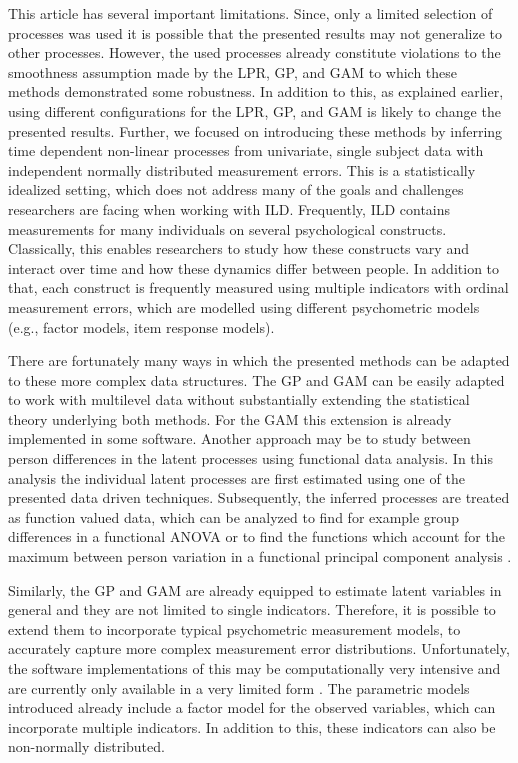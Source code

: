 \documentclass[man, floatsintext]{apa7}
\begin{document}
This article has several important limitations. Since, only a limited selection
of processes was used it is possible that the presented results may not
generalize to other processes. However, the used processes already constitute
violations to the smoothness assumption made by the LPR, GP, and GAM to which
these methods demonstrated some robustness. In addition to this, as explained
earlier, using different configurations for the LPR, GP, and GAM is likely to
change the presented results. Further, we focused on introducing these methods
by inferring time dependent non-linear processes from univariate, single
subject data with independent normally distributed measurement errors. This is
a statistically idealized setting, which does not address many of the goals and
challenges researchers are facing when working with ILD\@. Frequently, ILD
contains measurements for many individuals on several psychological constructs.
Classically, this enables researchers to study how these constructs vary and
interact over time and how these dynamics differ between people. In addition to
that, each construct is frequently measured using multiple indicators with
ordinal measurement errors, which are modelled using different psychometric
models (e.g., factor models, item response models).

There are fortunately many ways in which the presented methods can be adapted
to these more complex data structures. The GP and GAM can be easily adapted to
work with multilevel data without substantially extending the statistical
theory underlying both methods. For the GAM this extension is already
implemented in some software. Another approach may be to study between person
differences in the latent processes using functional data analysis. In this
analysis the individual latent processes are first estimated using one of the
presented data driven techniques. Subsequently, the inferred processes are
treated as function valued data, which can be analyzed to find for example
group differences in a functional ANOVA \parencite{kaufman_bayesian_2010} or to
find the functions which account for the maximum between person variation in a
functional principal component analysis \parencite{aue_prediction_2015}.

Similarly, the GP and GAM are already equipped to estimate latent variables in
general and they are not limited to single indicators. Therefore, it is
possible to extend them to incorporate typical psychometric measurement models,
to accurately capture more complex measurement error distributions.
Unfortunately, the software implementations of this may be computationally very
intensive and are currently only available in a very limited form
\parencite{clark_dynamic_2023}. The parametric models introduced already
include a factor model for the observed variables, which can incorporate
multiple indicators. In addition to this, these indicators can also be
non-normally distributed.
\end{document}
